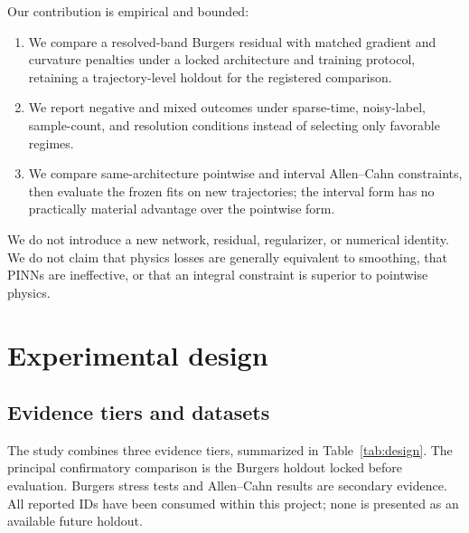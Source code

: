 \documentclass[a4paper,fleqn]{cas-sc}
\begin{document}
Our contribution is empirical and bounded:
\begin{enumerate}
  \item We compare a resolved-band Burgers residual with matched gradient and curvature penalties under a locked architecture and training protocol, retaining a trajectory-level holdout for the registered comparison.
  \item We report negative and mixed outcomes under sparse-time, noisy-label, sample-count, and resolution conditions instead of selecting only favorable regimes.
  \item We compare same-architecture pointwise and interval Allen--Cahn constraints, then evaluate the frozen fits on new trajectories; the interval form has no practically material advantage over the pointwise form.
\end{enumerate}

We do not introduce a new network, residual, regularizer, or numerical identity. We do not claim that physics losses are generally equivalent to smoothing, that PINNs are ineffective, or that an integral constraint is superior to pointwise physics.

\section{Experimental design}
\subsection{Evidence tiers and datasets}
The study combines three evidence tiers, summarized in Table~\ref{tab:design}. The principal confirmatory comparison is the Burgers holdout locked before evaluation. Burgers stress tests and Allen--Cahn results are secondary evidence. All reported IDs have been consumed within this project; none is presented as an available future holdout.
\end{document}
